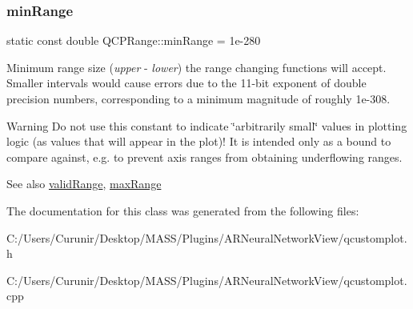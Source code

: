 \subsubsection{\texorpdfstring{min\+Range}{minRange}}
{\footnotesize\ttfamily static const double Q\+C\+P\+Range\+::min\+Range = 1e-\/280\hspace{0.3cm}{\ttfamily [static]}}

Minimum range size ({\itshape upper} -\/ {\itshape lower}) the range changing functions will accept. Smaller intervals would cause errors due to the 11-\/bit exponent of double precision numbers, corresponding to a minimum magnitude of roughly 1e-\/308.

\begin{DoxyWarning}{Warning}
Do not use this constant to indicate \char`\"{}arbitrarily small\char`\"{} values in plotting logic (as values that will appear in the plot)! It is intended only as a bound to compare against, e.\+g. to prevent axis ranges from obtaining underflowing ranges.
\end{DoxyWarning}
\begin{DoxySeeAlso}{See also}
\hyperlink{class_q_c_p_range_ab38bd4841c77c7bb86c9eea0f142dcc0}{valid\+Range}, \hyperlink{class_q_c_p_range_a34c2817056d5eb5c32524e34a85b4255}{max\+Range} 
\end{DoxySeeAlso}


The documentation for this class was generated from the following files\+:\begin{DoxyCompactItemize}
\item 
C\+:/\+Users/\+Curunir/\+Desktop/\+M\+A\+S\+S/\+Plugins/\+A\+R\+Neural\+Network\+View/qcustomplot.\+h\item 
C\+:/\+Users/\+Curunir/\+Desktop/\+M\+A\+S\+S/\+Plugins/\+A\+R\+Neural\+Network\+View/qcustomplot.\+cpp\end{DoxyCompactItemize}
